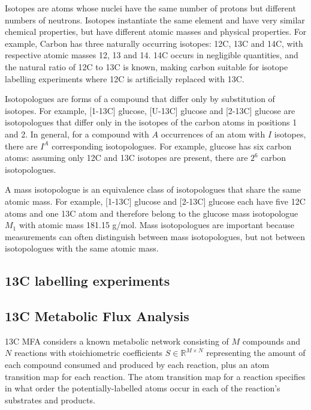 \documentclass{article}
\begin{document}
Isotopes are atoms whose nuclei have the same number of protons but
different numbers of neutrons. Isotopes instantiate the same element and
have very similar chemical properties, but have different atomic masses
and physical properties. For example, Carbon has three naturally
occurring isotopes: 12C, 13C and 14C, with respective atomic masses 12,
13 and 14. 14C occurs in negligible quantities, and the natural ratio of
12C to 13C is known, making carbon suitable for isotope labelling
experiments where 12C is artificially replaced with 13C.

Isotopologues are forms of a compound that differ only by substitution
of isotopes. For example, {[}1-13C{]} glucose, {[}U-13C{]} glucose and
{[}2-13C{]} glucose are isotopologues that differ only in the isotopes
of the carbon atoms in positions 1 and 2. In general, for a compound
with \(A\) occurrences of an atom with \(I\) isotopes, there are \(I^A\)
corresponding isotopologues. For example, glucose has six carbon atoms:
assuming only 12C and 13C isotopes are present, there are \(2^6\) carbon
isotopologues.

A mass isotopologue is an equivalence class of isotopologues that share
the same atomic mass. For example, {[}1-13C{]} glucose and {[}2-13C{]}
glucose each have five 12C atoms and one 13C atom and therefore belong
to the glucose mass isotopologue \(M_1\) with atomic mass 181.15 g/mol.
Mass isotopologues are important because measurements can often
distinguish between mass isotopologues, but not between isotopologues
with the same atomic mass.

\subsection{13C labelling experiments}\label{c-labelling-experiments}

\subsection{13C Metabolic Flux
Analysis}\label{c-metabolic-flux-analysis}

13C MFA considers a known metabolic network consisting of \(M\)
compounds and \(N\) reactions with stoichiometric coefficients
\(S\in\mathbb{R}^{M\times N}\) representing the amount of each compound
consumed and produced by each reaction, plus an atom transition map for
each reaction. The atom transition map for a reaction specifies in what
order the potentially-labelled atoms occur in each of the reaction's
substrates and products.
\end{document}
